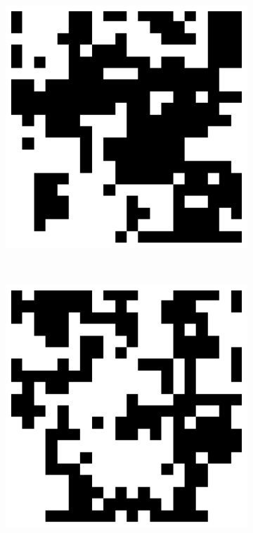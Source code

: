 \documentclass[11pt, a4paper]{report} %
\begin{document}
\begin{figure}[htb]
	\begin{subfigure}[c]{0.2\linewidth}
		\includegraphics[width=\linewidth]{20_by_20_Lattice_step5000_T=28.pdf}
	\end{subfigure}
	~
	\begin{subfigure}[c]{0.2\linewidth}
		\includegraphics[width=\linewidth]{20_by_20_Lattice_step5000_T=34.pdf}

\end{subfigure}
\end{figure}
\end{document}
